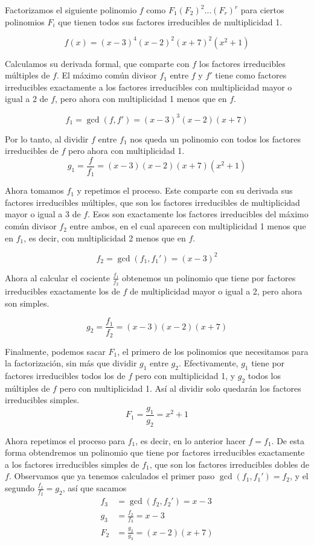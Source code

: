 \documentclass[./main.tex]{subfiles}
\begin{document}
Factorizamos el siguiente polinomio $f$ como $F_1(F_2)^2\dots (F_r)^r$ para ciertos polinomios $F_i$ que tienen todos sus factores irreducibles de multiplicidad 1.

\[ f(x) = (x - 3)^4(x - 2)^2(x + 7)^2(x^2+1) \]

Calculamos su derivada formal, que comparte con $f$ los factores irreducibles múltiples de $f$. El máximo común divisor $f_1$ entre $f$ y $f'$ tiene como factores irreducibles exactamente a los factores irreducibles con multiplicidad mayor o igual a 2 de $f$, pero ahora con multiplicidad 1 menos que en
$f$.

\[ f_1 = \gcd(f, f') =  (x - 3)^3 (x - 2) (x + 7)\]

Por lo tanto, al dividir $f$ entre $f_1$ nos queda un polinomio con todos los factores irreducibles de $f$ pero ahora con multiplicidad 1.
\[g_1 =\frac{f}{f_1}= (x - 3) (x - 2) (x + 7) (x^2+1)\]

Ahora tomamos $f_1$ y repetimos el proceso. Este comparte con su derivada sus factores irreducibles múltiples, que son los factores irreducibles de multiplicidad mayor o igual a 3 de $f$. Esos son exactamente los factores irreducibles del máximo común divisor $f_2$ entre ambos, en el cual aparecen con multiplicidad 1 menos que en $f_1$, es decir, con multiplicidad 2 menos que en $f$.

\[f_2 = \gcd(f_1, f_1') = (x-3)^2\]

Ahora al calcular el cociente $\frac{f_1}{f_2}$ obtenemos un polinomio que tiene por factores irreducibles exactamente los de $f$ de multiplicidad mayor o igual a 2, pero ahora son simples.

\[g_2 = \frac{f_1}{f_2}=(x-3)(x-2)(x+7)\]

Finalmente, podemos sacar $F_1$, el primero de los polinomios que necesitamos para la factorización, sin más que dividir $g_1$ entre $g_2$. Efectivamente, $g_1$ tiene por factores irreducibles todos los de $f$ pero con multiplicidad 1, y $g_2$ todos los múltiples de $f$ pero con multiplicidad 1. Así al dividir solo quedarán los factores irreducibles simples.
\[F_1 = \frac{g_1}{g_2}= x^2+1\]

Ahora repetimos el proceso para $f_1$, es decir, en lo anterior hacer $f = f_1$. De esta forma obtendremos un polinomio que tiene por factores irreducibles exactamente a los factores irreducibles simples de
$f_1$, que son los factores irreducibles dobles de $f$. Observamos que ya tenemos calculados el primer paso $\gcd(f_1, f_1') = f_2$, y el segundo $\frac{f_1}{f_2} = g_2$, así que sacamos
\begin{align*}
    f_3 &= \gcd(f_2, f_2') = x - 3\\
    g_3 &= \frac{f_2}{f_3} = x - 3 \\
    F_2 &= \frac{g_2}{g_3} = (x - 2) (x + 7)
\end{align*}
\end{document}
